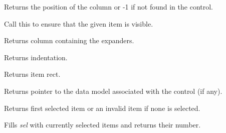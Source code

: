 
Returns the position of the column or -1 if not found in the control.

\label{wxdataviewctrlensurevisible}


Call this to ensure that the given item is visible.

\label{wxdataviewctrlgetexpandercolumn}


Returns column containing the expanders.

\label{wxdataviewctrlgetindent}


Returns indentation.

\label{wxdataviewctrlgetitemrect}


Returns item rect.

\label{wxdataviewctrlgetmodel}


Returns pointer to the data model associated with the
control (if any).

\label{wxdataviewctrlgetselection}


Returns first selected item or an invalid item if none is selected.

\label{wxdataviewctrlgetselections}


Fills {\it sel} with currently selected items and returns
their number.

\label{wxdataviewctrlgetsortingcolumn}

